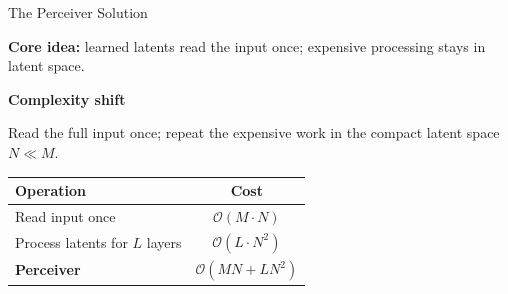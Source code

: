 \documentclass[aspectratio=169,11pt]{beamer}
\begin{document}
\begin{frame}[shrink=5]{The Perceiver Solution}
  \small
  \begin{center}
    \begin{minipage}{0.88\textwidth}
      \centering
      {\color{UnifiBlue}\textbf{Core idea:}} learned latents read the input once; expensive processing stays in latent space.
    \end{minipage}
  \end{center}

  \vspace{0.80em}
  \noindent
  \begin{minipage}[t]{0.29\textwidth}
  \end{minipage}\hfill
  \begin{minipage}[t]{0.29\textwidth}
  \end{minipage}\hfill
  \begin{minipage}[t]{0.29\textwidth}
  \end{minipage}

  \vspace{0.22em}
  \begin{center}
    {\color{UnifiDark}\bfseries Complexity shift}

    \vspace{0.18em}
    {\footnotesize Read the full input once; repeat the expensive work in the compact latent space $N \ll M$.}

    \vspace{0.24em}
    \scriptsize
    \renewcommand{\arraystretch}{1.04}
    \begin{tabular*}{0.66\textwidth}{@{\extracolsep{\fill}}lc}
      \toprule
      \textbf{Operation} & \textbf{Cost} \\
      \midrule
      Read input once & $\mathcal{O}(M \cdot N)$ \\
      Process latents for $L$ layers & $\mathcal{O}(L \cdot N^2)$ \\
      \midrule
      \textbf{Perceiver} & $\mathcal{O}(M N + L N^2)$ \\
      \bottomrule
    \end{tabular*}
  \end{center}
\end{frame}
\end{document}
